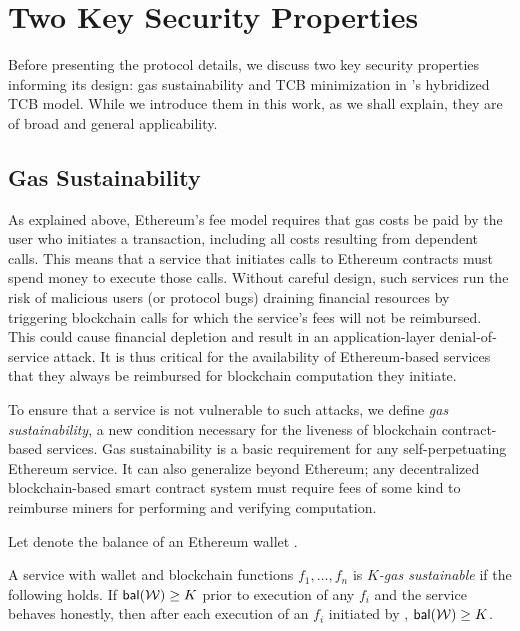 \section{Two Key Security Properties}

Before presenting the \tc protocol details, we discuss two key security properties informing its design: gas sustainability and TCB minimization in \tc's hybridized TCB model. While we introduce them in this work, as we shall explain, they are of broad and general applicability.

\subsection{Gas Sustainability}
\label{sec:gas-sustainability}

As explained above, Ethereum's fee model requires that gas costs be paid by the user who initiates a transaction, including all costs resulting from dependent calls.
This means that a service that initiates calls to Ethereum contracts must spend money to execute those calls.
Without careful design, such services run the risk of malicious users (or protocol bugs) draining financial resources by triggering blockchain calls for which the service's fees will not be reimbursed.
This could cause financial depletion and result in an application-layer denial-of-service attack.
It is thus critical for the availability of Ethereum-based services that they always be reimbursed for blockchain computation they initiate.

To ensure that a service is not vulnerable to such attacks, we define \emph{gas sustainability}, a new condition necessary for the liveness of blockchain contract-based services.
Gas sustainability is a basic requirement for any self-perpetuating Ethereum service.
It can also generalize beyond Ethereum;
any decentralized blockchain-based smart contract system must require fees of some kind to reimburse miners for performing and verifying computation.

Let \bal{\wallet} denote the balance of an Ethereum wallet \wallet.

\begin{definition}
  \label{def:gas-sustainability}
  A service with wallet \wallet and blockchain functions $f_1, \dotsc, f_n$ is \emph{$K$-gas sustainable} if the following holds.
If $\bal{\wallet} \geq K$ prior to execution of any $f_i$ and the service behaves honestly,
  then after each execution of an $f_i$ initiated by \wallet, $\bal{\wallet} \geq K$.
\end{definition}

